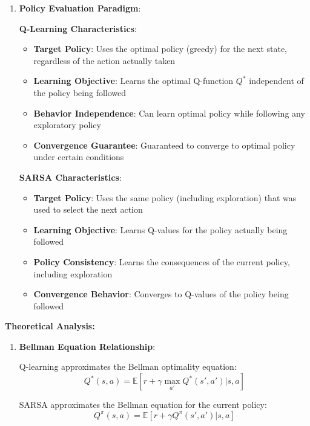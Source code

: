 \documentclass[12pt]{article}
\begin{document}
{{{\begin{enumerate}
    The critical difference lies in the target value calculation: Q-learning uses $\max_{a'} Q(s',a')$ while SARSA uses $Q(s',a')$ where $a'$ is the action actually taken.
    
    \item \textbf{Policy Evaluation Paradigm}:
    
    \textbf{Q-Learning Characteristics}:
    \begin{itemize}
        \item \textbf{Target Policy}: Uses the optimal policy (greedy) for the next state, regardless of the action actually taken
        \item \textbf{Learning Objective}: Learns the optimal Q-function $Q^*$ independent of the policy being followed
        \item \textbf{Behavior Independence}: Can learn optimal policy while following any exploratory policy
        \item \textbf{Convergence Guarantee}: Guaranteed to converge to optimal policy under certain conditions
    \end{itemize}
    
    \textbf{SARSA Characteristics}:
    \begin{itemize}
        \item \textbf{Target Policy}: Uses the same policy (including exploration) that was used to select the next action
        \item \textbf{Learning Objective}: Learns Q-values for the policy actually being followed
        \item \textbf{Policy Consistency}: Learns the consequences of the current policy, including exploration
        \item \textbf{Convergence Behavior}: Converges to Q-values of the policy being followed
    \end{itemize}
\end{enumerate}

\textbf{Theoretical Analysis:}

\begin{enumerate}
    \item \textbf{Bellman Equation Relationship}:
    
    Q-learning approximates the Bellman optimality equation:
    $$Q^*(s,a) = \mathbb{E}[r + \gamma \max_{a'} Q^*(s',a') | s,a]$$
    
    SARSA approximates the Bellman equation for the current policy:
    $$Q^\pi(s,a) = \mathbb{E}[r + \gamma Q^\pi(s',a') | s,a]$$
    

\end{enumerate}}}}
\end{document}

